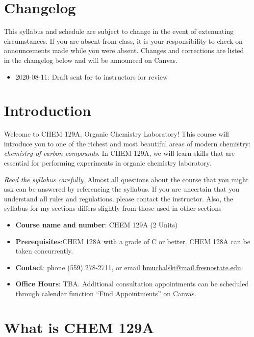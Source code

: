 \hypertarget{changelog}{%
\section{Changelog}\label{changelog}}

This syllabus and schedule are subject to change in the event of
extenuating circumstances. If you are absent from class, it is your
responsibility to check on announcements made while you were absent.
Changes and corrections are listed in the changelog below and will be
announced on Canvas.

\begin{itemize}
\tightlist
\item
  2020-08-11: Draft sent for to instructors for review
\end{itemize}

\hypertarget{introduction}{%
\section{Introduction}\label{introduction}}

Welcome to CHEM 129A, Organic Chemistry Laboratory! This course will
introduce you to one of the richest and most beautiful areas of modern
chemistry: \emph{chemistry of carbon compounds}. In CHEM 129A, we will
learn skills that are essential for performing experiments in organic
chemistry laboratory.

\emph{Read the syllabus carefully}. Almost all questions about the
course that you might ask can be answered by referencing the syllabus.
If you are uncertain that you understand all rules and regulations,
please contact the instructor. Also, the syllabus for my sections
differs slightly from those used in other sections

\begin{itemize}
\tightlist
\item
  \textbf{Course name and number}: CHEM 129A (2 Units)
\item
  \textbf{Prerequisites}:CHEM 128A with a grade of C or better. CHEM
  128A can be taken concurrently.
\item
  \textbf{Contact}: phone (559) 278-2711, or email
  \url{hmuchalski@mail.fresnostate.edu}
\item
  \textbf{Office Hours}: TBA. Additional consultation appointments can
  be scheduled through calendar function ``Find Appointments'' on
  Canvas.
\end{itemize}

\hypertarget{what-is-chem-129a}{%
\section{What is CHEM 129A}\label{what-is-chem-129a}}

